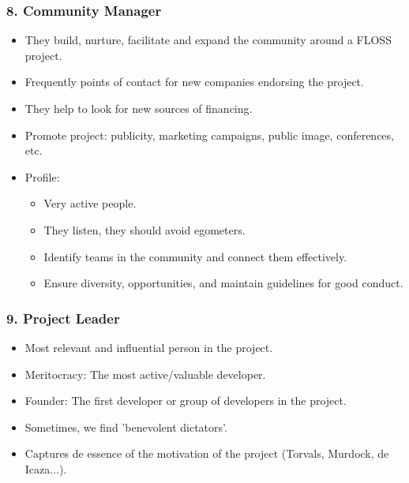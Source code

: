 \documentclass{beamer}
\begin{document}

\begin{frame}
 \frametitle{8. Community Manager}
 \begin{itemize}
  \item They build, nurture, facilitate and expand the community around
  a FLOSS project.
  \item Frequently points of contact for new companies endorsing the project.
  \item They help to look for new sources of financing.
  \item Promote project: publicity, marketing campaigns, public image, conferences, etc.
  \item Profile:
  \begin{itemize}
   \item Very active people.
   \item They listen, they should avoid egometers.
   \item Identify teams in the community and connect them effectively.
   \item Ensure diversity, opportunities, and maintain guidelines for good conduct.
  \end{itemize}

 \end{itemize}

\end{frame}


\begin{frame}
 \frametitle{9. Project Leader}
 \begin{itemize}
  \item Most relevant and influential person in the project.
  \item Meritocracy: The most active/valuable developer.
  \item Founder: The first developer or group of developers in the project.
  \item Sometimes, we find 'benevolent dictators'.
  \item Captures de essence of the motivation of the project (Torvals, Murdock, de Icaza...).
 \end{itemize}

\end{frame}


\end{document}
